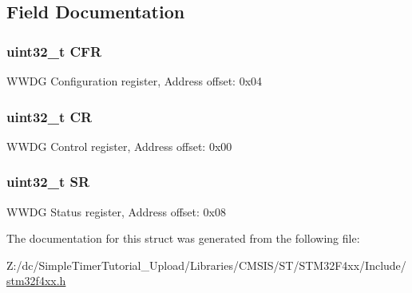 \subsection{Field Documentation}
\hypertarget{struct_w_w_d_g___type_def_ac011ddcfe531f8e16787ea851c1f3667}{
\subsubsection[{C\-F\-R}]{ uint32\-\_\-t C\-F\-R}}\label{struct_w_w_d_g___type_def_ac011ddcfe531f8e16787ea851c1f3667}
W\-W\-D\-G Configuration register, Address offset\-: 0x04 \hypertarget{struct_w_w_d_g___type_def_ab40c89c59391aaa9d9a8ec011dd0907a}{
\subsubsection[{C\-R}]{ uint32\-\_\-t C\-R}}\label{struct_w_w_d_g___type_def_ab40c89c59391aaa9d9a8ec011dd0907a}
W\-W\-D\-G Control register, Address offset\-: 0x00 \hypertarget{struct_w_w_d_g___type_def_af6aca2bbd40c0fb6df7c3aebe224a360}{
\subsubsection[{S\-R}]{ uint32\-\_\-t S\-R}}\label{struct_w_w_d_g___type_def_af6aca2bbd40c0fb6df7c3aebe224a360}
W\-W\-D\-G Status register, Address offset\-: 0x08 

The documentation for this struct was generated from the following file\-:\begin{DoxyCompactItemize}
\item 
Z\-:/dc/\-Simple\-Timer\-Tutorial\-\_\-\-Upload/\-Libraries/\-C\-M\-S\-I\-S/\-S\-T/\-S\-T\-M32\-F4xx/\-Include/\hyperlink{stm32f4xx_8h}{stm32f4xx.\-h}\end{DoxyCompactItemize}
